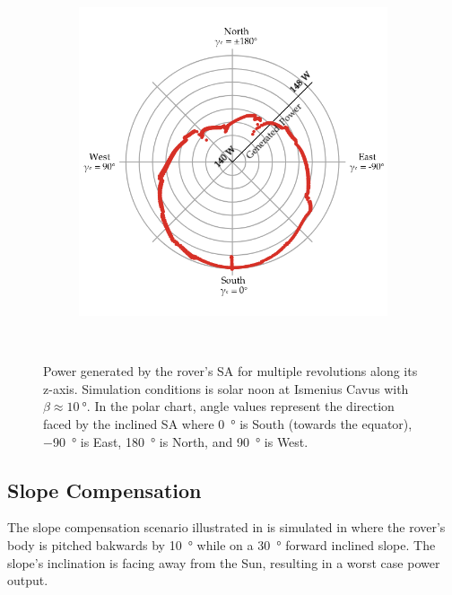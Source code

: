 \begin{figure}[h]
\begin{subfigure}[t]{\subfigureWidth}
        \includegraphics[height=\graphicsHeight]{sections/power-system-design/simulation/plots/zaxis-revolutions-polar.png}
		\label{fig:sub:simulation-data-rover-revolution-generated-power-polar-chart}
	\end{subfigure}\\[0.6ex]
    \caption[Power generated by the rover's solar array for multiple revolutions along its z-axis]
            {Power generated by the rover's \ac{SA} for multiple revolutions along its z-axis. Simulation conditions is solar noon at Ismenius Cavus with $\beta \approx \SI{10}{\degree}$. In the polar chart, angle values represent the direction faced by the inclined \ac{SA} where \SI{0}{\degree} is South (towards the equator), \SI{-90}{\degree} is East, \SI{180}{\degree} is North, and \SI{90}{\degree} is West.}
    \label{fig:simulation-data-rover-revolution-generated-power}
\vspace{-2ex}
\end{figure}


\subsection{Slope Compensation}

The slope compensation scenario illustrated in  is simulated in  where the rover's body is pitched bakwards by \SI{10}{\degree} while on a \SI{30}{\degree} forward inclined slope. The slope's inclination is facing away from the Sun, resulting in a worst case power output.

